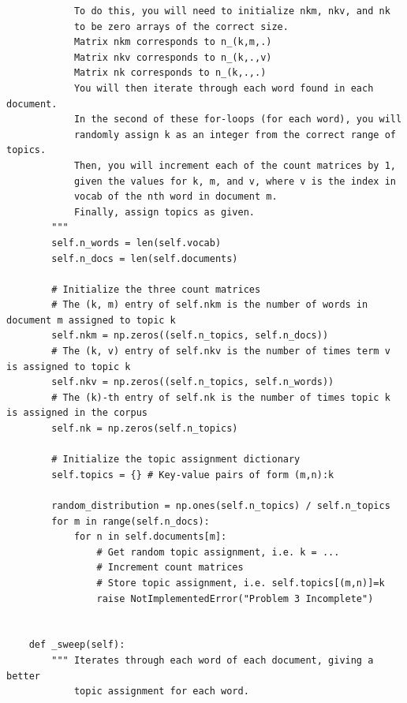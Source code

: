 \begin{lstlisting}
            To do this, you will need to initialize nkm, nkv, and nk 
            to be zero arrays of the correct size.
            Matrix nkm corresponds to n_(k,m,.)
            Matrix nkv corresponds to n_(k,.,v)
            Matrix nk corresponds to n_(k,.,.)
            You will then iterate through each word found in each document.
            In the second of these for-loops (for each word), you will 
            randomly assign k as an integer from the correct range of topics.
            Then, you will increment each of the count matrices by 1, 
            given the values for k, m, and v, where v is the index in 
            vocab of the nth word in document m.
            Finally, assign topics as given.
        """
        self.n_words = len(self.vocab)
        self.n_docs = len(self.documents)
                
        # Initialize the three count matrices
        # The (k, m) entry of self.nkm is the number of words in document m assigned to topic k
        self.nkm = np.zeros((self.n_topics, self.n_docs))
        # The (k, v) entry of self.nkv is the number of times term v is assigned to topic k
        self.nkv = np.zeros((self.n_topics, self.n_words))
        # The (k)-th entry of self.nk is the number of times topic k is assigned in the corpus
        self.nk = np.zeros(self.n_topics)
        
        # Initialize the topic assignment dictionary
        self.topics = {} # Key-value pairs of form (m,n):k
        
        random_distribution = np.ones(self.n_topics) / self.n_topics
        for m in range(self.n_docs):
            for n in self.documents[m]:
                # Get random topic assignment, i.e. k = ...
                # Increment count matrices
                # Store topic assignment, i.e. self.topics[(m,n)]=k
                raise NotImplementedError("Problem 3 Incomplete")
                
                
    def _sweep(self):
        """ Iterates through each word of each document, giving a better
            topic assignment for each word.
            

\end{lstlisting}
